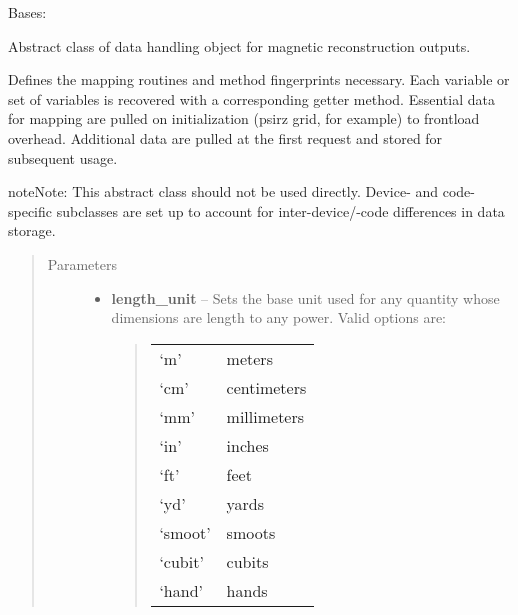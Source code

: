\documentclass[letterpaper,10pt,english]{sphinxmanual}
\begin{document}
\begin{fulllineitems}
\label{eqtools:eqtools.core.Equilibrium}
Bases: 

Abstract class of data handling object for magnetic reconstruction outputs.

Defines the mapping routines and method fingerprints necessary. Each
variable or set of variables is recovered with a corresponding getter method.
Essential data for mapping are pulled on initialization (psirz grid, for
example) to frontload overhead. Additional data are pulled at the first
request and stored for subsequent usage.

\begin{notice}{note}{Note:}
This abstract class should not be used directly. Device- and code-
specific subclasses are set up to account for inter-device/-code
differences in data storage.
\end{notice}
\begin{quote}\begin{description}
\item[{Parameters}] \leavevmode\begin{itemize}
\item {} 
\textbf{length\_unit} -- 
Sets the base unit used for any quantity whose
dimensions are length to any power. Valid options are:
\begin{quote}

\begin{tabulary}{\linewidth}{|L|L|}
\hline

`m'
 & 
meters
\\

`cm'
 & 
centimeters
\\

`mm'
 & 
millimeters
\\

`in'
 & 
inches
\\

`ft'
 & 
feet
\\

`yd'
 & 
yards
\\

`smoot'
 & 
smoots
\\

`cubit'
 & 
cubits
\\

`hand'
 & 
hands
\\


\end{tabulary}
\end{quote}
\end{itemize}
\end{description}
\end{quote}
\end{fulllineitems}
\end{document}
